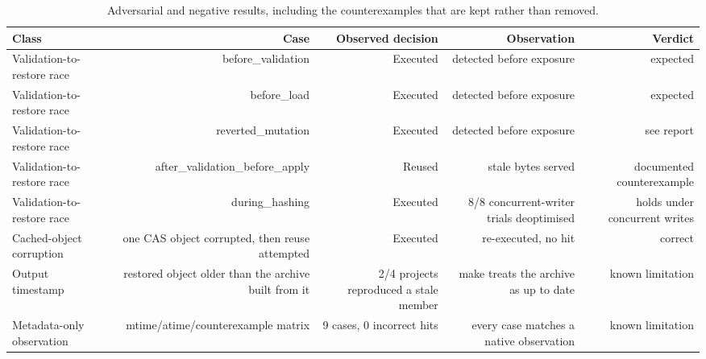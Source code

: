 \begin{table}[t]
\centering
\small
\caption{Adversarial and negative results, including the counterexamples that are kept rather than removed.}
\label{tab:correctness}
\begin{tabular}{lrrrr}
\toprule
\textbf{Class} & \textbf{Case} & \textbf{Observed decision} & \textbf{Observation} & \textbf{Verdict} \\
\midrule
Validation-to-restore race & before\_validation & Executed & detected before exposure & expected \\
Validation-to-restore race & before\_load & Executed & detected before exposure & expected \\
Validation-to-restore race & reverted\_mutation & Executed & detected before exposure & see report \\
Validation-to-restore race & after\_validation\_before\_apply & Reused & stale bytes served & documented counterexample \\
Validation-to-restore race & during\_hashing & Executed & 8/8 concurrent-writer trials deoptimised & holds under concurrent writes \\
Cached-object corruption & one CAS object corrupted, then reuse attempted & Executed & re-executed, no hit & correct \\
Output timestamp & restored object older than the archive built from it & 2/4 projects reproduced a stale member & make treats the archive as up to date & known limitation \\
Metadata-only observation & mtime/atime/counterexample matrix & 9 cases, 0 incorrect hits & every case matches a native observation & known limitation \\
\bottomrule
\end{tabular}
\end{table}
